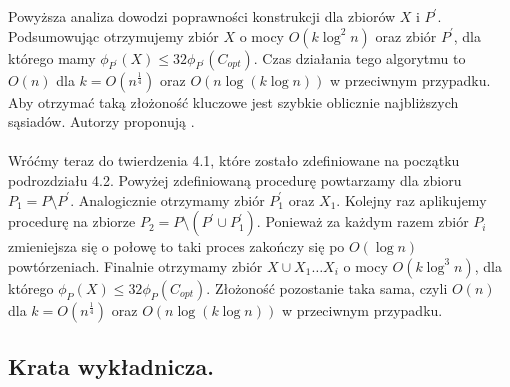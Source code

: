 \noindent
Powyższa analiza dowodzi poprawności konstrukcji dla zbiorów $X$ i $P^{'}$.
Podsumowując otrzymujemy zbiór $X$ o mocy $O(k \log^{2} n)$ oraz zbiór $P^{'}$, dla którego mamy $\phi_{P^{'}}(X) \leq 32\phi_{P^{'}}(C_{opt})$.
Czas działania tego algorytmu to $O(n)$ dla $k = O(n^{\frac{1}{4}})$ oraz $O(n \log (k \log n))$ w przeciwnym przypadku.
Aby otrzymać taką złożoność kluczowe jest szybkie oblicznie najbliższych sąsiadów.
Autorzy proponują \cite{10.1145/293347.293348}.
\\~\\
Wróćmy teraz do twierdzenia 4.1, które zostało zdefiniowane na początku podrozdziału 4.2.
Powyżej zdefiniowaną procedurę powtarzamy dla zbioru $P_{1} = P \setminus P^{'}$.
Analogicznie otrzymamy zbiór $P_{1}^{'}$ oraz $X_{1}$.
Kolejny raz aplikujemy procedurę na zbiorze $P_{2} = P \setminus (P^{'} \cup P_{1}^{'})$.
Ponieważ za każdym razem zbiór $P_{i}$ zmieniejsza się o połowę to taki proces zakończy się po $O(\log n)$ powtórzeniach.
Finalnie otrzymamy zbiór $X \cup X_{1} \dots X_{i}$ o mocy $O(k \log^{3} n)$, dla którego $\phi_{P}(X) \leq 32\phi_{P}(C_{opt})$.
Złożoność pozostanie taka sama, czyli $O(n)$ dla $k = O(n^{\frac{1}{4}})$ oraz $O(n \log (k \log n))$ w przeciwnym przypadku.

\subsection{Krata wykładnicza.}

